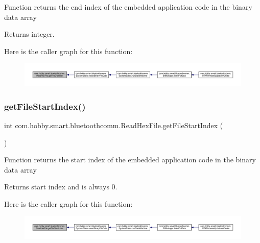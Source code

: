 Function returns the end index of the embedded application code in the binary data array \begin{DoxyReturn}{Returns}
integer. 
\end{DoxyReturn}
Here is the caller graph for this function\+:\nopagebreak
\begin{figure}[H]
\begin{center}
\leavevmode
\includegraphics[width=350pt]{classcom_1_1hobby_1_1smart_1_1bluetoothcomm_1_1_read_hex_file_aa9a9b3a41b9658187eb0b48c0ebc1271_icgraph}
\end{center}
\end{figure}
\mbox{\label{classcom_1_1hobby_1_1smart_1_1bluetoothcomm_1_1_read_hex_file_a0ba2cab8f8b6d327ea7de323026f8a4b}} 
\subsubsection{\texorpdfstring{get\+File\+Start\+Index()}{getFileStartIndex()}}
{\footnotesize\ttfamily int com.\+hobby.\+smart.\+bluetoothcomm.\+Read\+Hex\+File.\+get\+File\+Start\+Index (\begin{DoxyParamCaption}{ }\end{DoxyParamCaption})}

Function returns the start index of the embedded application code in the binary data array \begin{DoxyReturn}{Returns}
start index and is always 0. 
\end{DoxyReturn}
Here is the caller graph for this function\+:\nopagebreak
\begin{figure}[H]
\begin{center}
\leavevmode
\includegraphics[width=350pt]{classcom_1_1hobby_1_1smart_1_1bluetoothcomm_1_1_read_hex_file_a0ba2cab8f8b6d327ea7de323026f8a4b_icgraph}
\end{center}
\end{figure}
\mbox{\label{classcom_1_1hobby_1_1smart_1_1bluetoothcomm_1_1_read_hex_file_aeb5e651ddbcbfe813d0ce57efac2ff31}} 
